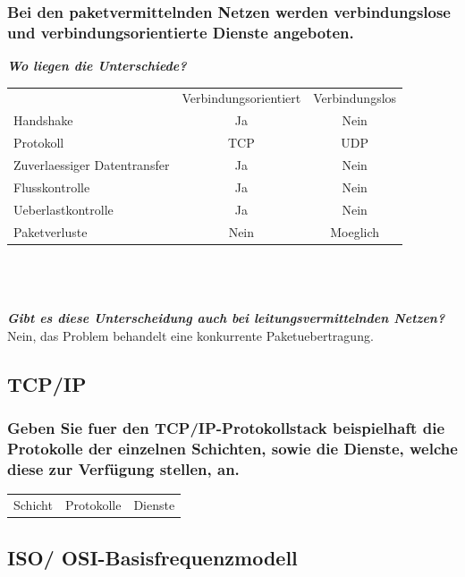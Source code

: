 \documentclass{article}
\newcommand{\gap}{\\ \ \\}
\newcommand{\headline}[1]{\textbf{\textit{#1}}\\}
\begin{document}
\subsubsection{
    Bei den paketvermittelnden Netzen werden verbindungslose und 
    verbindungsorientierte Dienste angeboten.
}
\headline{Wo liegen die Unterschiede?}
\begin{tabular}{l|c|c}
        &Verbindungsorientiert&Verbindungslos\\
    Handshake&
        Ja&Nein\\
    \hline
    Protokoll&
        TCP&UDP\\
    Zuverlaessiger Datentransfer&
        Ja&Nein\\
    Flusskontrolle&
        Ja&Nein\\
    Ueberlastkontrolle&
        Ja&Nein\\
    \hline
    Paketverluste&
        Nein&Moeglich\\
\end{tabular}\\
\gap
\headline{Gibt es diese Unterscheidung auch bei leitungsvermittelnden Netzen?} 
Nein, das Problem behandelt eine konkurrente Paketuebertragung.\\

\subsection{TCP/IP}
\subsubsection{
    Geben Sie fuer den TCP/IP-Protokollstack beispielhaft die 
    Protokolle der einzelnen Schichten, sowie die Dienste,
    welche diese zur Verfügung stellen, an.
}
\begin{tabular}{l|l|l}
    Schicht & Protokolle & Dienste\\
\end{tabular}
\subsection{ISO/ OSI-Basisfrequenzmodell}
\end{document}
